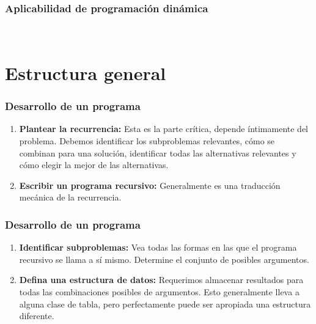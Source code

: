 \documentclass[english, spanish, fleqn,%
hyperref = {colorlinks, urlcolor = blue}%
]{beamer}
\begin{document}
\begin{frame}
  \setcounter{beamerpauses}{2}
  \frametitle{Aplicabilidad de programación dinámica}

  \\ \medskip
\end{frame}

\section{Estructura general}

\begin{frame}
  \setcounter{beamerpauses}{2}
  \frametitle{Desarrollo de un programa}

  \begin{enumerate}[font = \textbf, label = {(\alph*)}]
  \item \textbf{Plantear la recurrencia:}
    Esta es la parte crítica,
    depende íntimamente del problema.
    Debemos identificar los subproblemas relevantes,
    cómo se combinan para una solución,
    identificar todas las alternativas relevantes
    y cómo elegir la mejor de las alternativas.
  \item \textbf{Escribir un programa recursivo:}
    Generalmente es una traducción mecánica de la recurrencia.
  \end{enumerate}
\end{frame}

\begin{frame}
  \setcounter{beamerpauses}{2}
  \frametitle{Desarrollo de un programa}

  \begin{enumerate}[font = \textbf, label = {(\alph*)}, start = 3]
  \item \textbf{Identificar subproblemas:}
    \label{step:dp:identify}
    Vea todas las formas en las que el programa recursivo se llama a sí mismo.
    Determine el conjunto de posibles argumentos.
  \item \textbf{Defina una estructura de datos:}
    Requerimos almacenar resultados para todas las combinaciones posibles
    de argumentos.
    Esto generalmente lleva a alguna clase de tabla,
    pero perfectamente puede ser apropiada una estructura diferente.
  \end{enumerate}
\end{frame}
\end{document}
